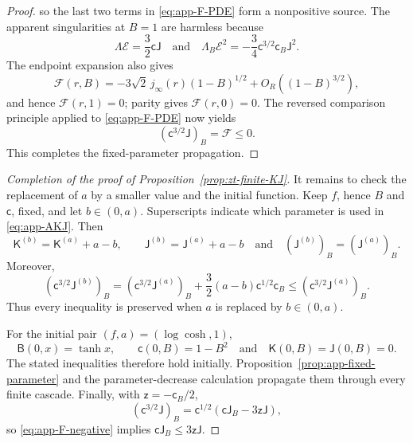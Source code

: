 \documentclass[10pt]{amsart}
\theoremstyle{definition}
\theoremstyle{remark}
\numberwithin{equation}{section}
\newcommand{\1}{\mathbf 1}
\begin{document}
\begin{proof}
so the last two terms in \eqref{eq:app-F-PDE} form a nonpositive source.  The apparent singularities at $B=1$ are harmless because
\begin{equation*}
 \Lambda\mathcal E=\frac32\mathsf c\mathsf J\quad\text{and}\quad
 \Lambda_B\mathcal E^2=-\frac34\mathsf c^{3/2}\mathsf c_B\mathsf J^2.
\end{equation*}
The endpoint expansion also gives
\begin{equation*}
 \mathcal F(r,B)
 =-3\sqrt2\,j_\infty(r)(1-B)^{1/2}
 +O_R((1-B)^{3/2}),
\end{equation*}
and hence $\mathcal F(r,1)=0$; parity gives $\mathcal F(r,0)=0$.  The reversed comparison principle applied to \eqref{eq:app-F-PDE} now yields
\begin{equation}
 (\mathsf c^{3/2}\mathsf J)_B=\mathcal F\leq0.
 \label{eq:app-F-negative}
\end{equation}
This completes the fixed-parameter propagation.
\end{proof}

\begin{proof}[Completion of the proof of
Proposition~\ref{prop:zt-finite-KJ}] It remains to check the replacement of $a$ by a smaller value and the initial function. Keep $f$, hence $B$ and $\mathsf c$, fixed, and let $b\in(0,a)$. Superscripts indicate which parameter is used in \eqref{eq:app-AKJ}. Then
\begin{equation*}
 \mathsf K^{(b)}=\mathsf K^{(a)}+a-b,\qquad
 \mathsf J^{(b)}=\mathsf J^{(a)}+a-b\quad\text{and}\quad
 (\mathsf J^{(b)})_B=(\mathsf J^{(a)})_B.
\end{equation*}
Moreover,
\begin{equation*}
 (\mathsf c^{3/2}\mathsf J^{(b)})_B
 =(\mathsf c^{3/2}\mathsf J^{(a)})_B
 +\frac32(a-b)\mathsf c^{1/2}\mathsf c_B
 \leq(\mathsf c^{3/2}\mathsf J^{(a)})_B.
\end{equation*}
Thus every inequality is preserved when $a$ is replaced by $b\in(0,a)$.

For the initial pair $(f,a)=(\log\cosh,1)$,
\begin{equation*}
 \mathsf B(0,x)=\tanh x,\qquad \mathsf c(0,B)=1-B^2
 \quad\text{and}\quad \mathsf K(0,B)=\mathsf J(0,B)=0.
\end{equation*}
The stated inequalities therefore hold initially. Proposition~\ref{prop:app-fixed-parameter} and the parameter-decrease calculation propagate them through every finite cascade. Finally, with $\mathsf z=-\mathsf c_B/2$,
\begin{equation*}
 (\mathsf c^{3/2}\mathsf J)_B=\mathsf c^{1/2}(\mathsf c\mathsf J_B-3\mathsf z\mathsf J),
\end{equation*}
so \eqref{eq:app-F-negative} implies $\mathsf c\mathsf J_B\leq3\mathsf z\mathsf J$.
\end{proof}
\end{document}
